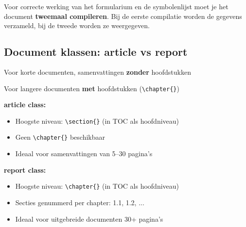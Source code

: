 \documentclass[a4paper,11pt]{article}
\begin{document}
\begin{waarschuwing}
Voor correcte werking van het formularium en de symbolenlijst moet je het document 
\textbf{tweemaal compileren}. Bij de eerste compilatie worden de gegevens verzameld,
bij de tweede worden ze weergegeven.
\end{waarschuwing}

\subsection{Document klassen: article vs report}

\begin{schoolconcept}
\begin{description}[leftmargin=2.5cm]
    \item[\texttt{article}] Voor korte documenten, samenvattingen \textbf{zonder} hoofdstukken
    \item[\texttt{report}] Voor langere documenten \textbf{met} hoofdstukken (\verb|\chapter{}|)
\end{description}
\end{schoolconcept}

\begin{theorie}[Structuurverschillen]
\textbf{article class:}
\begin{itemize}[leftmargin=1.5cm]
    \item Hoogste niveau: \verb|\section{}| (in TOC als hoofdniveau)
    \item Geen \verb|\chapter{}| beschikbaar
    \item Ideaal voor samenvattingen van 5--30 pagina's
\end{itemize}

\textbf{report class:}
\begin{itemize}[leftmargin=1.5cm]
    \item Hoogste niveau: \verb|\chapter{}| (in TOC als hoofdniveau)
    \item Secties genummerd per chapter: 1.1, 1.2, ...
    \item Ideaal voor uitgebreide documenten 30+ pagina's
\end{itemize}
\end{theorie}
\end{document}
